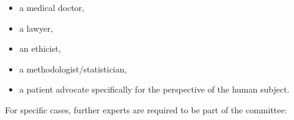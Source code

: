 \documentclass[authordate, meta]{jote-new-article}
\begin{document}
\begin{itemize}
  \item a medical doctor,



  \item a lawyer,



  \item an ethicist,



  \item a methodologist/statistician,



  \item a patient advocate specifically for the perspective of the human subject.


\end{itemize}

For specific cases, further experts are required to be part of the committee:
\end{document}

